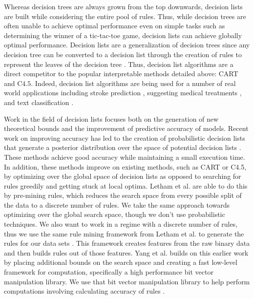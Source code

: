 Whereas decision trees are always grown from the top downwards, decision lists are built while considering the entire pool of rules.
Thus, while decision trees are often unable to achieve optimal performance even on simple tasks such as determining the winner of a tic-tac-toe game, decision lists can achieve globally optimal performance.
Decision lists are a generalization of decision trees since any decision tree can be converted to a decision list through the creation of rules to represent the leaves of the decision tree \cite{Rivest87}.
Thus, decision list algorithms are a direct competitor to the popular interpretable methods detailed above: CART and C$4.5$.
Indeed, decision list algorithms are being used for a number of real world applications including stroke prediction \cite{LethamRuMcMa15}, suggesting medical treatments \cite{ZhangLaTsDa2015}, and text classification \cite{LiYa02}.

Work in the field of decision lists focuses both on the generation of new theoretical bounds and the improvement of predictive accuracy of models.
Recent work on improving accuracy has led to the creation of probabilistic decision lists that generate a posterior distribution over the space of potential decision lists \cite{LethamRuMcMa15,YangRuSe16}.
These methods achieve good accuracy while maintaining a small execution time.
In addition, these methods improve on existing methods, such as CART or C4.5, by optimizing over the global space of decision lists as opposed to searching for rules greedily and getting stuck at local optima.
Letham et al. are able to do this by pre-mining rules, which reduces the search space from every possible split of the data to a discrete number of rules.
We take the same approach towards optimizing over the global search space, though we don’t use probabilistic techniques.
We also want to work in a regime with a discrete number of rules, thus we use the same rule mining framework from Letham et al. to generate the rules for our data sets \cite{LethamRuMcMa15}.
This framework creates features from the raw binary data and then builds rules out of those features.
Yang et al. builds on this earlier work by placing additional bounds on the search space and creating a fast low-level framework for computation, specifically a high performance bit vector manipulation library.
We use that bit vector manipulation library to help perform computations involving calculating accuracy of rules \cite{YangRuSe16}.

